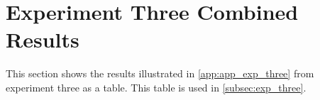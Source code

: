 \section{Experiment Three Combined Results}\label{app:exp-3-table-res}

This section shows the results illustrated in \cref{app:app_exp_three} from experiment three as a table. This table is used in \cref{subsec:exp_three}.

